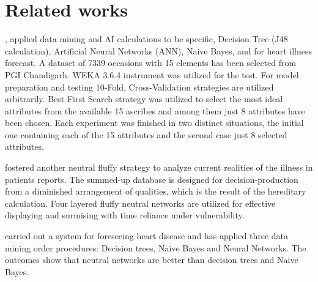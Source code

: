 \section{Related works}{
\setlength{\parskip}{1em}

\citealp{taneja2013heart}, applied data mining and AI calculations to be specific, Decision Tree (J48 calculation), Artificial Neural Networks (ANN), Naive Bayes, and for heart illness forecast. A dataset of 7339 occasions with 15 elements has been selected from PGI Chandigarh. WEKA 3.6.4 instrument was utilized for the test. For model preparation and testing 10-Fold, Cross-Validation strategies are utilized arbitrarily. Best First Search strategy was utilized to select the most ideal attributes from the available 15 ascribes and among them just 8 attributes have been chosen. Each experiment was finished in two distinct situations, the initial one containing each of the 15 attributes and the second case just 8 selected attributes.

\citealp{setthukkarase2012intelligent} fostered another neutral fluffy strategy to analyze current realities of the illness in patients reports. The summed-up database is designed for decision-production from a diminished arrangement of qualities, which is the result of the hereditary calculation. Four layered fluffy neutral networks are utilized for effective displaying and surmising with time reliance under vulnerability.

\citealp{dangare2012improved} carried out a system for foreseeing heart disease and has applied three data mining order procedures: Decision trees, Naive Bayes and Neural Networks. The outcomes show that neutral networks are better than decision trees and Naive Bayes.

}
